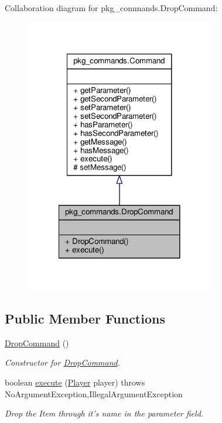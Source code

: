 Collaboration diagram for pkg\-\_\-commands.\-Drop\-Command\-:
\nopagebreak
\begin{figure}[H]
\begin{center}
\leavevmode
\includegraphics[width=234pt]{classpkg__commands_1_1DropCommand__coll__graph}
\end{center}
\end{figure}
\subsection*{Public Member Functions}
\begin{DoxyCompactItemize}
\item 
\hyperlink{classpkg__commands_1_1DropCommand_a2e755d7f4b0735183553d5d97d624f0c}{Drop\-Command} ()
\begin{DoxyCompactList}\small\item\em Constructor for \hyperlink{classpkg__commands_1_1DropCommand}{Drop\-Command}. \end{DoxyCompactList}\item 
boolean \hyperlink{classpkg__commands_1_1DropCommand_a742e37b2d2dd4e111130811ee2f4dd0b}{execute} (\hyperlink{classpkg__world_1_1Player}{Player} player)  throws No\-Argument\-Exception,\-Illegal\-Argument\-Exception 
\begin{DoxyCompactList}\small\item\em Drop the Item through it's name in the parameter field. \end{DoxyCompactList}\end{DoxyCompactItemize}
